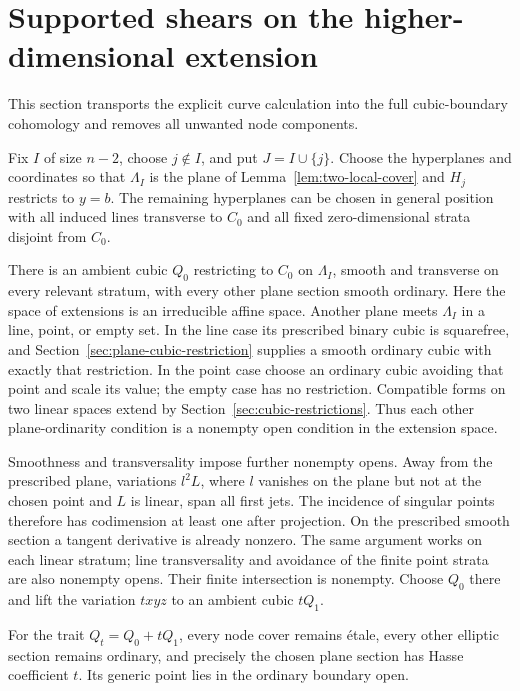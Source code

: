\section{Supported shears on the higher-dimensional extension}\label{sec:higher-two-support}
This section transports the explicit curve calculation into the full cubic-boundary cohomology and removes all unwanted node components.

Fix $I$ of size $n-2$, choose $j\notin I$, and put $J=I\cup\{j\}$. Choose the hyperplanes and coordinates so that $\Lambda_I$ is the plane of Lemma~\ref{lem:two-local-cover} and $H_j$ restricts to $y=b$. The remaining hyperplanes can be chosen in general position with all induced lines transverse to $C_0$ and all fixed zero-dimensional strata disjoint from $C_0$.

There is an ambient cubic $Q_0$ restricting to $C_0$ on $\Lambda_I$, smooth and transverse on every relevant stratum, with every other plane section smooth ordinary. Here the space of extensions is an irreducible affine space. Another plane meets $\Lambda_I$ in a line, point, or empty set. In the line case its prescribed binary cubic is squarefree, and Section~\ref{sec:plane-cubic-restriction} supplies a smooth ordinary cubic with exactly that restriction. In the point case choose an ordinary cubic avoiding that point and scale its value; the empty case has no restriction. Compatible forms on two linear spaces extend by Section~\ref{sec:cubic-restrictions}. Thus each other plane-ordinarity condition is a nonempty open condition in the extension space.

Smoothness and transversality impose further nonempty opens. Away from the prescribed plane, variations $l^2L$, where $l$ vanishes on the plane but not at the chosen point and $L$ is linear, span all first jets. The incidence of singular points therefore has codimension at least one after projection. On the prescribed smooth section a tangent derivative is already nonzero. The same argument works on each linear stratum; line transversality and avoidance of the finite point strata are also nonempty opens. Their finite intersection is nonempty. Choose $Q_0$ there and lift the variation $txyz$ to an ambient cubic $tQ_1$.

For the trait $Q_t=Q_0+tQ_1$, every node cover remains \textup{\'etale}, every other elliptic section remains ordinary, and precisely the chosen plane section has Hasse coefficient $t$. Its generic point lies in the ordinary boundary open.

